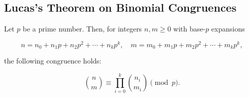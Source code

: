 \subsection{Lucas's Theorem on Binomial Congruences}

Let $p$ be a prime number. Then, for integers $n, m \geq 0$ with base-$p$ expansions

$$n = n_0 + n_1 p + n_2 p^2 + \cdots + n_k p^k, \quad
m = m_0 + m_1 p + m_2 p^2 + \cdots + m_k p^k,$$

the following congruence holds:

$$
\binom{n}{m} \equiv \prod_{i=0}^k \binom{n_i}{m_i} \pmod{p}.
$$
